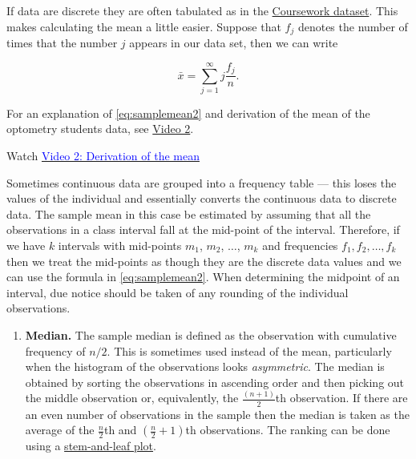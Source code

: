 \documentclass[
]{book}
\providecommand{\tightlist}{%
  \setlength{\itemsep}{0pt}\setlength{\parskip}{0pt}}
\begin{document}
If data are discrete they are often tabulated as in the \protect\hyperlink{intro_example}{Coursework dataset}. This makes calculating the mean a little easier. Suppose that \(f_j\) denotes the number of times that the number \(j\) appears in our data set, then we can write

\begin{equation}
    \bar{x} = \sum\limits_{j=1}^\infty j \frac{f_j}{n}.
    \label{eq:samplemean2}
    \end{equation}

For an explanation of \eqref{eq:samplemean2} and derivation of the mean of the optometry students data, see \protect\hyperlink{video2}{Video 2}.

Watch \href{https://mediaspace.nottingham.ac.uk/media/Sample+Mean+FINAL+VERSION/1_4cyoy4po}{\textcolor{blue}{Video 2: Derivation of the mean}}

Sometimes continuous data are grouped into a frequency table --- this loses the values of the individual and essentially converts the continuous data to discrete data.
The sample mean in this case be estimated by
assuming that all the observations in a class interval fall at the
mid-point of the interval. Therefore, if we have \(k\) intervals with
mid-points \(m_1\), \(m_2\), \(\dots\), \(m_k\) and frequencies
\(f_1 , f_2 , \ldots , f_k\) then we treat the mid-points as though they are the
discrete data values and we can use the formula in \eqref{eq:samplemean2}.
When determining the midpoint of an interval, due notice should be
taken of any rounding of the individual observations.

\begin{enumerate}
\def\labelenumi{\arabic{enumi}.}
\setcounter{enumi}{1}
\tightlist
\item
  {\textbf{Median.}} The sample median is defined as the observation with
  cumulative frequency of \(n/2\). This is sometimes used instead of the
  mean, particularly when the histogram of the observations looks
  \emph{asymmetric}. The median is obtained by
  sorting the observations in ascending order and then
  picking out the middle observation or, equivalently, the
  \(\frac{(n+1)}{2}\)th observation. If there are an even number of
  observations in the sample then the median is taken as the average
  of the \(\frac{n}{2}\)th and \(\left(\frac{n}{2}+1\right)\)th
  observations. The ranking can be done using a \protect\hyperlink{visual_plot_stem}{stem-and-leaf plot}.
\end{enumerate}
\end{document}

